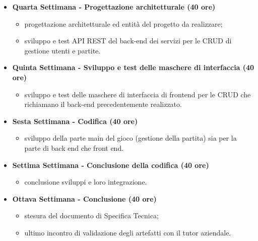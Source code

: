 {\begin{itemize}
\begin{itemize}
        \end{itemize}
        \item \textbf{Quarta Settimana - Progettazione architetturale (40 ore)} 
        \begin{itemize}
            \item progettazione architetturale ed entità del progetto da realizzare;
            \item sviluppo e test API REST del back-end dei servizi per le CRUD di gestione utenti e partite.
        \end{itemize}
        \item \textbf{Quinta Settimana - Sviluppo e test delle maschere di interfaccia (40 ore)} 
        \begin{itemize}
            \item sviluppo e test delle maschere di interfaccia di frontend per 
            le CRUD che richiamano il back-end precedentemente realizzato.
        \end{itemize}
        \item \textbf{Sesta Settimana - Codifica (40 ore)} 
        \begin{itemize}
            \item sviluppo della parte main del gioco (gestione della partita) sia per la
            parte di back end che front end.
        \end{itemize}
        \item \textbf{Settima Settimana - Conclusione della codifica (40 ore)} 
        \begin{itemize}
            \item conclusione sviluppi e loro integrazione.
        \end{itemize}
        \item \textbf{Ottava Settimana - Conclusione (40 ore)} 
        \begin{itemize}
            \item stesura del documento di Specifica Tecnica;
            \item ultimo incontro di validazione degli artefatti con il tutor aziendale.
        \end{itemize}
    \end{itemize}
}

\newcommand{\totaleOre}{312}

